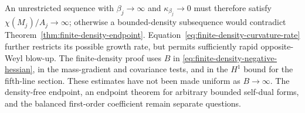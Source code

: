 An unrestricted sequence with $\beta_j\to\infty$ and
$\kappa_{\beta_j}\to0$ must therefore satisfy
$\chi(M_j)/A_j\to\infty$; otherwise a bounded-density subsequence
would contradict Theorem~\ref{thm:finite-density-endpoint}.
Equation~\eqref{eq:finite-density-curvature-rate} further restricts
its possible growth rate, but permits sufficiently rapid opposite-Weyl
blow-up.  The finite-density proof uses $B$ in
\eqref{eq:finite-density-negative-hessian}, in the mass-gradient and
covariance tests, and in the $H^1$ bound for the fifth-line section.
These estimates have not been made uniform as $B\to\infty$.
The density-free endpoint, an endpoint theorem for arbitrary bounded
self-dual forms, and the balanced first-order coefficient remain
separate questions.

